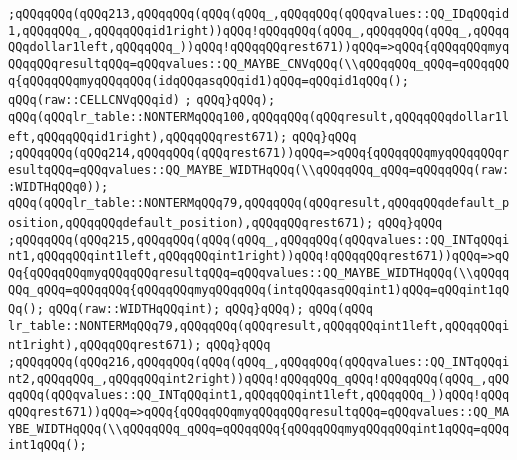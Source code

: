 \verb|;qQQqqQQq(qQQq213,qQQqqQQq(qQQq(qQQq_,qQQqqQQq(qQQqvalues::QQ_IDqQQqid1,qQQqqQQq_,qQQqqQQqid1right))qQQq!qQQqqQQq(qQQq_,qQQqqQQq(qQQq_,qQQqqQQqdollar1left,qQQqqQQq_))qQQq!qQQqqQQqrest671))qQQq=>qQQq{qQQqqQQqmyqQQqqQQqresultqQQq=qQQqvalues::QQ_MAYBE_CNVqQQq(\\qQQqqQQq_qQQq=qQQqqQQq{qQQqqQQqmyqQQqqQQq(idqQQqasqQQqid1)qQQq=qQQqid1qQQq();|\newline
\verb|qQQq(raw::CELLCNVqQQqid)|\newline
\verb|;|\newline
\verb|qQQq}qQQq);|\newline
\verb|qQQq(qQQqlr_table::NONTERMqQQq100,qQQqqQQq(qQQqresult,qQQqqQQqdollar1left,qQQqqQQqid1right),qQQqqQQqrest671);|\newline
\verb|qQQq}qQQq|\newline
\verb|;qQQqqQQq(qQQq214,qQQqqQQq(qQQqrest671))qQQq=>qQQq{qQQqqQQqmyqQQqqQQqresultqQQq=qQQqvalues::QQ_MAYBE_WIDTHqQQq(\\qQQqqQQq_qQQq=qQQqqQQq(raw::WIDTHqQQq0));|\newline
\verb|qQQq(qQQqlr_table::NONTERMqQQq79,qQQqqQQq(qQQqresult,qQQqqQQqdefault_position,qQQqqQQqdefault_position),qQQqqQQqrest671);|\newline
\verb|qQQq}qQQq|\newline
\verb|;qQQqqQQq(qQQq215,qQQqqQQq(qQQq(qQQq_,qQQqqQQq(qQQqvalues::QQ_INTqQQqint1,qQQqqQQqint1left,qQQqqQQqint1right))qQQq!qQQqqQQqrest671))qQQq=>qQQq{qQQqqQQqmyqQQqqQQqresultqQQq=qQQqvalues::QQ_MAYBE_WIDTHqQQq(\\qQQqqQQq_qQQq=qQQqqQQq{qQQqqQQqmyqQQqqQQq(intqQQqasqQQqint1)qQQq=qQQqint1qQQq();|\newline
\verb|qQQq(raw::WIDTHqQQqint);|\newline
\verb|qQQq}qQQq);|\newline
\verb|qQQq(qQQq|\newline
\verb|lr_table::NONTERMqQQq79,qQQqqQQq(qQQqresult,qQQqqQQqint1left,qQQqqQQqint1right),qQQqqQQqrest671);|\newline
\verb|qQQq}qQQq|\newline
\verb|;qQQqqQQq(qQQq216,qQQqqQQq(qQQq(qQQq_,qQQqqQQq(qQQqvalues::QQ_INTqQQqint2,qQQqqQQq_,qQQqqQQqint2right))qQQq!qQQqqQQq_qQQq!qQQqqQQq(qQQq_,qQQqqQQq(qQQqvalues::QQ_INTqQQqint1,qQQqqQQqint1left,qQQqqQQq_))qQQq!qQQqqQQqrest671))qQQq=>qQQq{qQQqqQQqmyqQQqqQQqresultqQQq=qQQqvalues::QQ_MAYBE_WIDTHqQQq(\\qQQqqQQq_qQQq=qQQqqQQq{qQQqqQQqmyqQQqqQQqint1qQQq=qQQqint1qQQq();|\newline
